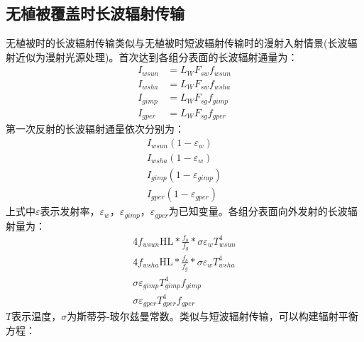 \subsection{无植被覆盖时长波辐射传输}
无植被时的长波辐射传输类似与无植被时短波辐射传输时的漫射入射情景(长波辐射近似为漫射光源处理)。首次达到各组分表面的长波辐射通量为：
\begin{equation}
\begin{aligned} I_{wsun} &=L_{W} F_{s w} f_{wsun} \\ I_{wsha} &=L_{W} F_{s w} f_{wsha} \\ I_{gimp} &=L_{W} F_{s g} f_{gimp} \\ I_{gper} &=L_{W} F_{s g} f_{gper} \end{aligned}
\end{equation}
第一次反射的长波辐射通量依次分别为：
\begin{equation}
\begin{array}{c}I_{wsun}\left(1-\varepsilon_{w}\right) \\ I_{wsha}\left(1-\varepsilon_{w}\right) \\ I_{gimp}\left(1-\varepsilon_{gimp}\right) \\ I_{gper}\left(1-\varepsilon_{gper}\right)\end{array}
\end{equation}
上式中$\varepsilon$表示发射率，$\varepsilon_w$，$\varepsilon_{gimp}$，$\varepsilon_{gper}$为已知变量。各组分表面向外发射的长波辐射量为：
\begin{equation}
\begin{array}{c}4 f_{wsun} \mathrm{HL} * \frac{f_{b}}{f_{g}} * \sigma \varepsilon_{w} T_{wsun}^{4} \\ 4 f_{wsha} \mathrm{HL} * \frac{f_{b}}{f_{g}} * \sigma \varepsilon_{w} T_{wsha}^{4} \\ \sigma \varepsilon_{gimp} T_{gimp}^{4} f_{gimp} \\ \sigma \varepsilon_{gper} T_{gper}^{4} f_{gper}\end{array}
\end{equation}
$T$表示温度，$\sigma$为斯蒂芬-玻尔兹曼常数。类似与短波辐射传输，可以构建辐射平衡方程：
